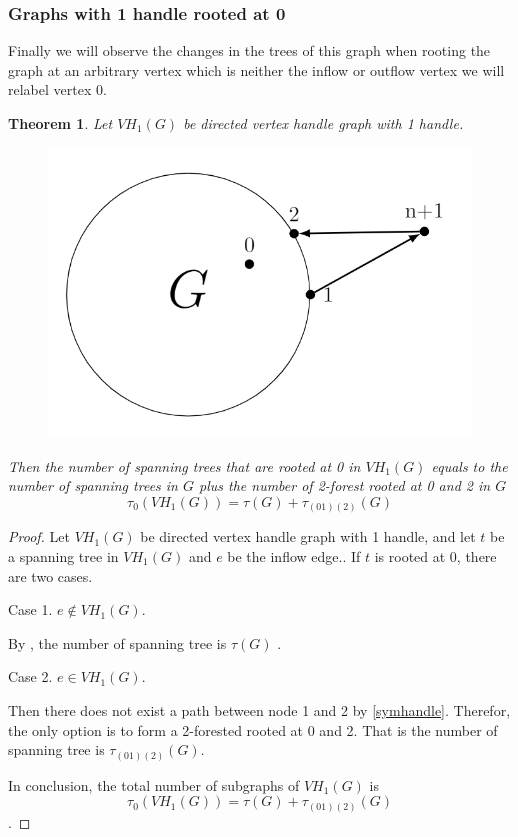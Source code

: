 \documentclass[twoside,11pt]{article}
\newtheorem{theorem}{Theorem}[section]
\numberwithin{equation}{section} \DeclareMathOperator{\Var}{Var}
\newcommand{\bpf}{\begin{proof}}
\newcommand{\epf}{\end{proof}}
\newcommand{\bthm}{\begin{theorem}}
\newcommand{\ethm}{\end{theorem}}
\begin{document}
\subsubsection{Graphs with 1 handle rooted at 0}
Finally we will observe the changes in the trees of this graph when rooting the graph at an arbitrary vertex which is neither the inflow or outflow vertex we will relabel vertex 0. 

\bthm
Let $VH_1(G)$ be directed vertex handle graph with 1 handle. 
\begin{figure}[H]
    \centering
    \includegraphics[scale=0.3]{tik_1handle.PNG}
\end{figure}
Then the number of spanning trees that are rooted at 0 in $VH_1(G)$ equals to the number of spanning trees in $G$ plus the number of 2-forest rooted at 0 and 2 in $G$\[
 \tau_0 (VH_1(G)) = \tau(G)+\tau_{(01)(2)}(G) 
\]
\ethm

\bpf
Let $VH_1(G)$ be directed vertex handle graph with 1 handle, and let $t$ be a spanning tree in $VH_1(G)$ and $e$ be the inflow edge.. If $t$ is rooted at 0, there are two cases.

Case 1. $e\notin VH_1(G)$. 

By , the number of spanning tree is $\tau(G)$ .

Case 2. $e \in VH_1(G)$. 

Then there does not exist a path between node 1 and 2 by \cref{symhandle}. Therefor, the only option is to form a 2-forested rooted at 0 and 2. That is the number of spanning tree is $\tau_{(01)(2)}(G)$.

In conclusion, the total number of subgraphs of $VH_1(G)$ is  \\
$$\tau_0 (VH_1(G)) = \tau(G)+\tau_{(01)(2)}(G)$$ .
\epf
\end{document}
